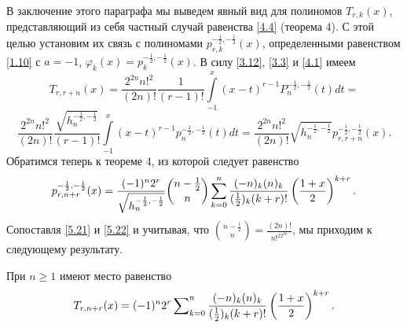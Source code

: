    В заключение этого параграфа мы выведем явный вид для полиномов  $T_{r,k}(x)$, представляющий из себя частный случай равенства \eqref{4.4} (теорема 4). С этой целью установим их связь с полиномами $p_{r,k}^{-\frac12,-\frac12}(x)$, определенными равенством \eqref{1.10} с $a=-1$, $\varphi_k(x)=p_{k}^{-\frac12,-\frac12}(x)$. В силу \eqref{3.12},  \eqref{3.3} и \eqref{4.1} имеем
 $$
 T_{r,r+n}(x) =  \frac{2^{2n}{n!}^2}{(2n)!}\frac{1}{(r-1)!}\int\limits_{-1}^x(x-t)^{r-1}
   P_n^{-\frac{1}{2},-\frac{1}{2}}(t)dt=
$$
\begin{equation}\label{5.21}
\frac{2^{2n}{n!}^2}{(2n)!}\frac{\sqrt{h_n^{-\frac{1}{2},-\frac{1}{2}}}}{(r-1)!}
\int\limits_{-1}^x(x-t)^{r-1}
   p_n^{-\frac{1}{2},-\frac{1}{2}}(t)dt= \frac{2^{2n}{n!}^2}{(2n)!}\sqrt{h_n^{-\frac{1}{2},-\frac{1}{2}}}
   p_{r,r+n}^{-\frac12,-\frac12}(x).
\end{equation}
Обратимся теперь к теореме 4, из которой следует равенство
\begin{equation}\label{5.22}
p_{r,n+r}^{-\frac{1}{2},-\frac{1}{2}}(x)=\frac{(-1)^n2^{r}}{\sqrt{ h_n^{-\frac{1}{2},-\frac{1}{2}}}}
{n-\frac{1}{2}\choose n}
\sum_{k=0}^n{(-n)_k(n)_k\over (\frac12)_k(k+r)!}
\left({1+x\over 2}\right)^{k+r}.
\end{equation}
 Сопоставля \eqref{5.21} и \eqref{5.22} и учитывая, что ${n-\frac{1}{2}\choose n}=\frac{(2n)!}{n!^22^{2n}}$, мы приходим к следующему результату.
\begin{corollary} При $n\ge1$ имеют место равенство
\begin{equation}\label{5.23}
T_{r,n+r}(x)=(-1)^n2^r\sum\nolimits_{k=0}^n{(-n)_k(n)_k\over (\frac12)_k(k+r)!}
\left({1+x\over 2}\right)^{k+r}.
\end{equation}
\end{corollary}


